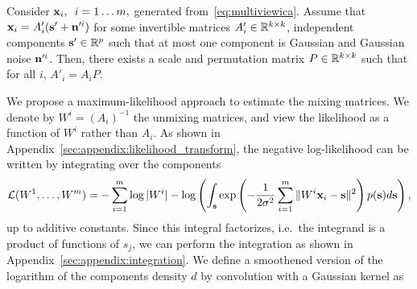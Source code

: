 \documentclass[12pt]{report}
\begin{document}
%
\begin{proposition}
\label{prop:identifiability}
Consider $\mathbf{x}_i, \enspace i=1\dots m,$ generated from~\eqref{eq:multiviewica}.
Assume that $\mathbf{x}_i = A'_i(\mathbf{s}' + \mathbf{n}'^i)$ for some invertible matrices $A'_i\in
\mathbb{R}^{k\times k}$, independent components $\mathbf{s}'\in \mathbb{R}^p$ such that at most
one component is Gaussian and Gaussian noise $\mathbf{n}'^i$. Then, there exists a scale and permutation matrix $P\in \mathbb{R}^{k\times k}$ such that for all $i$, $A'_i = A_i P$.
\end{proposition}
%
%
%
%
%
%
%
We propose a maximum-likelihood approach to estimate the mixing matrices. 
We denote by $W^i = (A_i)^{-1}$ the unmixing matrices, and view the likelihood as a function of $W^i$ rather than $A_i$. As shown in Appendix~\ref{sec:appendix:likelihood_transform}, the negative log-likelihood can be written by integrating over the components
\begin{equation} 
    \label{eq:likelihood}
    \mathcal{L}(W^1, \dots, W^m) = -\sum_{i=1}^m\log|W^i| - \log\left(\int_{\mathbf{s}}\exp\left(-\frac1{2\sigma^2}\sum_{i=1}^m\|W^i\mathbf{x}_i - \mathbf{s}\|^2\right)p(\mathbf{s})d\mathbf{s}\right),
\end{equation}
up to additive constants.
%
Since this integral factorizes, i.e.\ the integrand is a product of functions of $s_j$, we can perform the integration as shown in Appendix~\ref{sec:appendix:integration}. We define a smoothened version of the logarithm of the components density $d$ by convolution with a Gaussian kernel as
\end{document}
